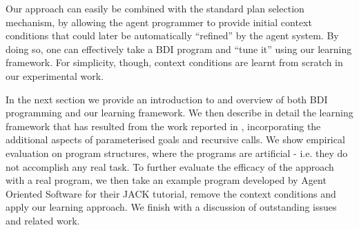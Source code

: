 Our approach can easily be combined with the standard plan selection
mechanism, by allowing the agent programmer to provide initial context conditions
that could later be automatically ``refined'' by the agent system. By doing so,
one can effectively take a BDI program and ``tune it'' using our learning
framework.
For simplicity, though, context conditions are learnt from scratch in our
experimental work.

In the next section we provide an introduction to and overview of both
BDI programming and our learning framework. We then describe in detail
the learning framework that has resulted from the work reported in
\cite{aamas}, incorporating the additional aspects of parameterised
goals and recursive calls. We show empirical evaluation on program
structures, where the programs are artificial - i.e. they do not
accomplish any real task. To further evaluate the efficacy of the approach
with a real program, we then take an example program developed by
Agent Oriented Software for their JACK tutorial, remove the context
conditions and apply our learning approach.  We finish with a
discussion of outstanding issues and related work.

%
